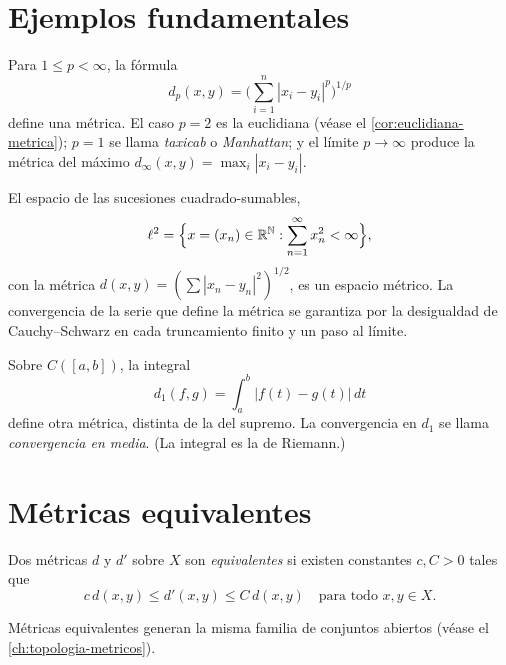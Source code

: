\section{Ejemplos fundamentales}

\begin{example}
\label{ej:lp}
Para $1\leq p<\infty$, la fórmula
\[
  d_p(x,y)=\biggl(\sum_{i=1}^{n}|x_i-y_i|^p\biggr)^{1/p}
\]
define una métrica. El caso $p=2$ es la euclidiana (véase el \cref{cor:euclidiana-metrica}); $p=1$ se llama \emph{taxicab} o \emph{Manhattan}; y el límite $p\to\infty$ produce la métrica del máximo $d_\infty(x,y)=\max_i|x_i-y_i|$.
\end{example}

\begin{example}
\label{ej:hilbert}
El espacio de las sucesiones cuadrado-sumables,
\[
  \ell^2=\Bigl\{x=(x_n)\in\mathbb{R}^{\mathbb{N}}:\sum_{n=1}^{\infty}x_n^2<\infty\Bigr\},
\]
con la métrica $d(x,y)=(\sum|x_n-y_n|^2)^{1/2}$, es un espacio métrico. La convergencia de la serie que define la métrica se garantiza por la desigualdad de Cauchy--Schwarz en cada truncamiento finito y un paso al límite.
\end{example}

\begin{example}
\label{ej:l1}
Sobre $C([a,b])$, la integral
\[
  d_1(f,g)=\int_a^b|f(t)-g(t)|\,dt
\]
define otra métrica, distinta de la del supremo. La convergencia en $d_1$ se llama \emph{convergencia en media}. (La integral es la de Riemann.)
\end{example}

\section{Métricas equivalentes}

\begin{definition}
\label{def:metricas-equivalentes}
Dos métricas $d$ y $d'$ sobre $X$ son \emph{equivalentes} si existen constantes $c,C>0$ tales que
\[
  c\,d(x,y)\leq d'(x,y)\leq C\,d(x,y)\quad\text{para todo }x,y\in X.
\]
\end{definition}

\begin{proposition}
\label{prop:equiv-misma-topologia}
Métricas equivalentes generan la misma familia de conjuntos abiertos (véase el \cref{ch:topologia-metricos}).
\end{proposition}

